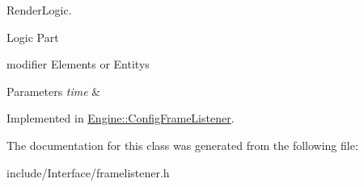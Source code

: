 Render\+Logic. 

Logic Part


\begin{DoxyItemize}
\item modifier Elements or Entitys
\end{DoxyItemize}


\begin{DoxyParams}{Parameters}
{\em time} & \\
\hline
\end{DoxyParams}


Implemented in \hyperlink{classEngine_1_1ConfigFrameListener_addb569607e5f870efda08a1a7de41544}{Engine\+::\+Config\+Frame\+Listener}.



The documentation for this class was generated from the following file\+:\begin{DoxyCompactItemize}
\item 
include/\+Interface/framelistener.\+h\end{DoxyCompactItemize}

